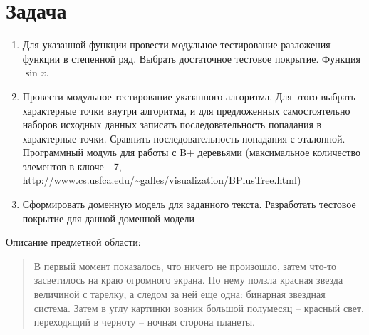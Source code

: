 \section{Задача}
\begin{enumerate}
	\item Для указанной функции провести модульное тестирование разложения
	      функции в степенной ряд.
	      Выбрать достаточное тестовое покрытие.
	      Функция \( \sin x \).
	\item Провести модульное тестирование указанного алгоритма.
	      Для этого выбрать характерные точки внутри алгоритма,
	      и для предложенных самостоятельно наборов исходных данных записать
	      последовательность попадания в характерные точки.
	      Сравнить последовательность попадания с эталонной.
	      Программный модуль для работы с B+ деревьями
	      (максимальное количество элементов в ключе - 7, \url{http://www.cs.usfca.edu/~galles/visualization/BPlusTree.html})
	\item Сформировать доменную модель для заданного текста.  Разработать тестовое покрытие для данной доменной модели
\end{enumerate}


Описание предметной области:
\begin{quote}
	В первый момент показалось, что ничего не произошло, затем что-то засветилось на краю огромного экрана. По нему ползла красная звезда величиной с тарелку, а следом за ней еще одна: бинарная звездная система. Затем в углу картинки возник большой полумесяц -- красный свет, переходящий в черноту -- ночная сторона планеты.
\end{quote}

